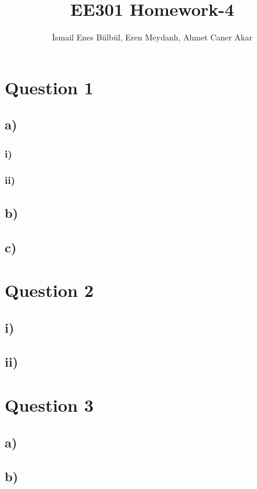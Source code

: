 \documentclass[12pt]{article}
\title{EE301 Homework-4}
\author{İsmail Enes Bülbül, Eren Meydanlı, Ahmet Caner Akar}
\begin{document}
\maketitle

    \section*{Question 1}
    \subsection*{a)}
    \subsubsection*{i)}       
    
    \subsubsection*{ii)}
    
    \subsection*{b)}
    
    \subsection*{c)}
    
    \section*{Question 2}
    \subsection*{i)}
    
    \subsection*{ii)}
    
    \section*{Question 3}
    \subsection*{a)}
    
    \subsection*{b)}
\end{document}
